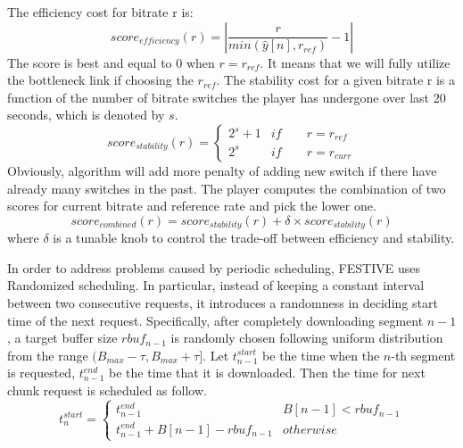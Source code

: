 \documentclass[journal]{IEEEtran}
\begin{document}
The efficiency cost for bitrate r is:
 \begin{equation}
 score_{efficiency}(r)=|\frac{r}{min(\hat{y}[n],r_{ref})}-1|
 \end{equation}
 The score is best and equal to 0 when $r = r_{ref}$. It means that we will fully utilize the bottleneck link if choosing the $r_{ref}$.
 The stability cost for a given bitrate r is a function of the number
 of bitrate switches the player has undergone over last 20 seconds, which is denoted by $s$. 
 \begin{equation}
 score_{stability}(r)=\begin{cases}
 2^{s}+1 & if\qquad r=r_{ref}\\
 2^{s} & if\qquad r=r_{curr}
 \end{cases}
 \end{equation}
 Obviously, algorithm will add more penalty of adding new switch if there have already many switches in the past.
 The player computes the combination of two scores for current bitrate and reference rate and pick the lower one. 
 \begin{equation}
 score_{combined}(r)=score_{stability}(r)+\delta\times score_{stability}(r)
 \end{equation}
where $\delta$ is a tunable knob to control the trade-off between efficiency and stability.
\par In order to address problems caused by periodic scheduling, FESTIVE uses Randomized scheduling. In particular, instead of keeping a constant interval between two consecutive requests, it introduces a randomness in deciding start time of the next request.  Specifically, after completely downloading segment $n-1$, a target buffer size $rbuf_{n-1}$ is randomly chosen following uniform distribution from the range  $(B_{max}-\tau,B_{max}+\tau]$. Let $t^{start}_{n-1}$ be the time when the $n$-th segment is requested, $t^{end}_{n-1}$  be the
time that it is downloaded. Then the time for next chunk request is scheduled as follow.
\begin{equation}
t_{n}^{start}=\begin{cases}
t_{n-1}^{end} & B[n-1]<rbuf_{n-1}\\
t_{n-1}^{end}+B[n-1]-rbuf_{n-1} & otherwise
\end{cases}
\end{equation}
\end{document}
